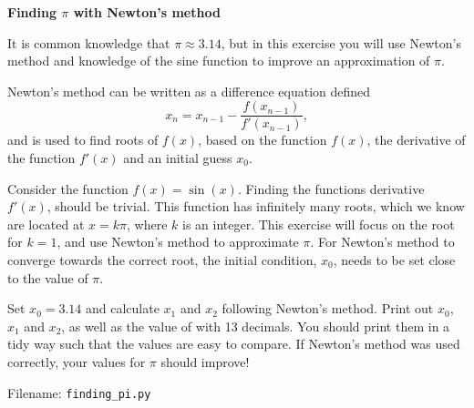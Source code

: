 \begin{Problem} \textbf{{Finding $\pi$ with Newton's method}}

\noindent
It is common knowledge that $\pi \approx 3.14$, but in this exercise you will use Newton's method and knowledge of the sine function to improve an approximation of $\pi$.

Newton's method can be written as a difference equation defined \begin{equation*}
    x_n = x_{n - 1} - \frac {f(x_{n-1})} {f'(x_{n-1}) } ,
\end{equation*}
and is used to find roots of $f(x)$, based on the function $f(x)$, the derivative of the function $f'(x)$ and an initial guess $x_0$.

Consider the function $f(x) = \sin(x)$. Finding the functions derivative $f'(x)$, should be trivial. This function has infinitely many roots, which we know are located at $x = k \pi$, where $k$ is an integer. This exercise will focus on the root for $k = 1$, and use Newton's method to approximate $\pi$. For Newton's method to converge towards the correct root, the initial condition, $x_0$, needs to be set close to the value of $\pi$.
\bigskip

Set $x_0 = 3.14$ and calculate $x_1$ and $x_2$ following Newton's method. Print out $x_0$, $x_1$ and $x_2$, as well as the value of  with 13 decimals. You should print them in a tidy way such that the values are easy to compare. If Newton's method was used correctly, your values for $\pi$ should improve!


Filename: \texttt{finding\_pi.py}
\end{Problem}


